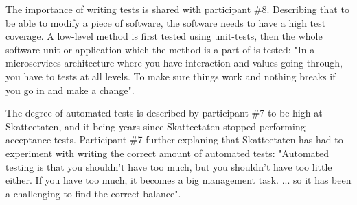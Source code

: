 The importance of writing tests is shared with participant \#8. Describing that to be able to modify a piece of software, the software needs to have a high test coverage. A low-level method is first tested using unit-tests, then the whole software unit or application which the method is a part of is tested: "In a \gls{microservices} architecture where you have interaction and values going through, you have to tests at all levels. To make sure things work and nothing breaks if you go in and make a change".



The degree of automated tests is described by participant \#7 to be high at Skatteetaten, and it being years since Skatteetaten stopped performing acceptance tests. Participant \#7 further explaning that Skatteetaten has had to experiment with writing the correct amount of automated tests: "Automated testing is that you shouldn't have too much, but you shouldn't have too little either. If you have too much, it becomes a big management task. ... so it has been a challenging to find the correct balance".


